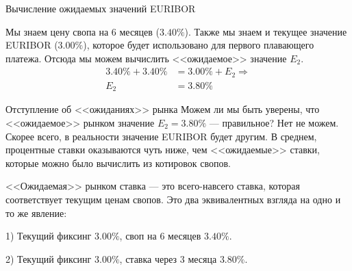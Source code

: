 \documentclass{beamer}
\begin{document}
\begin{frame}{Вычисление ожидаемых значений EURIBOR}
\centering
{}

\justify
Мы знаем цену свопа на 6 месяцев ($3.40\%$). Также мы знаем и текущее значение EURIBOR ($3.00\%$), которое будет использовано для первого плавающего платежа. Отсюда мы можем вычислить <<ожидаемое>> значение $E_2$.
\begin{align*}
3.40\% + 3.40\% &= 3.00\% + E_2 \Rightarrow \\
E_2 &= 3.80\%
\end{align*}

\end{frame}



\begin{frame}{Отступление об <<ожиданиях>> рынка}
\justify
Можем ли мы быть уверены, что <<ожидаемое>> рынком значение $E_2=3.80\%$ --- правильное? Нет не можем. Скорее всего, в реальности значение EURIBOR будет другим. В среднем, процентные ставки оказываются чуть ниже, чем <<ожидаемые>> ставки, которые можно было вычислить из котировок свопов.

\justify
<<Ожидаемая>> рынком ставка --- это всего-навсего ставка, которая соответствует текущим ценам свопов. Это два эквивалентных взгляда на одно и то же явление:

1) Текущий фиксинг $3.00\%$, своп на 6 месяцев $3.40\%$.

2) Текущий фиксинг $3.00\%$, ставка через 3 месяца $3.80\%$.
\end{frame}
\end{document}
